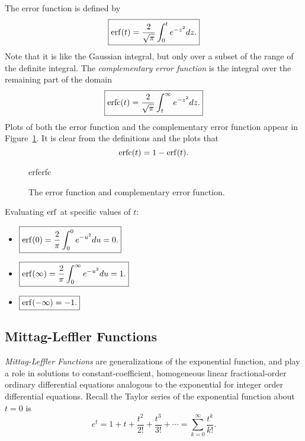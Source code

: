 The error function is defined by
\begin{equation}
  \boxed{ \operatorname{erf}(t) = \frac{2}{\sqrt{\pi}} \int_0^t e^{-z^2} dz. }
  \label{eq:erf}
\end{equation}
Note that it is like the Gaussian integral, but only over a subset of the range of the definite integral. The \emph{complementary error function} is the integral over the remaining part of the domain
\begin{equation}
  \boxed{ \operatorname{erfc}(t)  = \frac{2}{\sqrt{\pi}} \int_t^\infty e^{-z^2} dz. }
  \label{eq:erfc}
\end{equation}
Plots of both the error function and the complementary error function appear in Figure~\ref{fig:erferfc}. It is clear from the definitions and the plots that
\begin{equation}
  \operatorname{erfc}(t) = 1 - \operatorname{erf}(t).
  \label{eq:erfs}
\end{equation}

\begin{figure}
  \centering
  {erferfc}
  \caption{The error function and complementary error function.}
  \label{fig:erferfc}
\end{figure}

Evaluating $\operatorname{erf}$ at specific values of $t$:
\begin{itemize}
  \item $ \boxed{ \operatorname{erf}(0) = \frac{2}{\pi} \int_0^0 e^{-u^2} du = 0. }$
  \item $ \boxed{ \operatorname{erf}(\infty) = \frac{2}{\pi} \int_0^\infty e^{-u^2} du = 1. }$
  \item $ \boxed{ \operatorname{erf}(-\infty) = -1. }$
\end{itemize}

\subsection{Mittag-Leffler Functions}
\emph{Mittag-Leffler Functions} are generalizations of the exponential function, and play a role in solutions to constant-coefficient, homogeneous linear fractional-order ordinary differential equations analogous to the exponential for integer order differential equations. Recall the Taylor series of the exponential function about $t=0$ is
\begin{equation*}
  e^{t} = 1 + t + \frac{t^2}{2!} + \frac{t^3}{3!} + \cdots = \sum_{k=0}^\infty \frac{t^k}{k!}.
\end{equation*}


